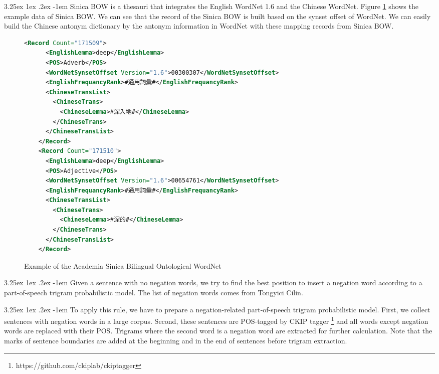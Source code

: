 \documentclass[12pt]{article}
\makeatletter
\newcounter{subsubsubsection}[subsubsection]
\renewcommand\paragraph{\@startsection{paragraph}{5}{\z@}%
  {3.25ex \@plus1ex \@minus.2ex}%
  {-1em}%
  {\normalfont\normalsize\bfseries}}
\makeatother
\begin{document}
\begin{CJK*}{UTF8}{bkai}
\begin{spacing}{1.77}
\paragraph{}
Sinica BOW is a thesauri that integrates the English WordNet 1.6 and the Chinese WordNet. Figure \ref{fig:bow} shows the example data of Sinica BOW. We can see that the record of the Sinica BOW is built based on the synset offset of WordNet. We can easily build the Chinese antonym dictionary by the antonym information in WordNet with these mapping records from Sinica BOW.

\begin{figure}
  \centering
  \caption{Example of the Academia Sinica Bilingual Ontological WordNet}
  \begin{minipage}{\linewidth}
    \begin{lstlisting}[language=XML]
    <Record Count="171509">
      <EnglishLemma>deep</EnglishLemma>
      <POS>Adverb</POS>
      <WordNetSynsetOffset Version="1.6">00300307</WordNetSynsetOffset>
      <EnglishFrequancyRank>#通用詞彙#</EnglishFrequancyRank>
      <ChineseTransList>
        <ChineseTrans>
          <ChineseLemma>#深入地#</ChineseLemma>
        </ChineseTrans>
      </ChineseTransList>
    </Record>
    <Record Count="171510">
      <EnglishLemma>deep</EnglishLemma>
      <POS>Adjective</POS>
      <WordNetSynsetOffset Version="1.6">00654761</WordNetSynsetOffset>
      <EnglishFrequancyRank>#通用詞彙#</EnglishFrequancyRank>
      <ChineseTransList>
        <ChineseTrans>
          <ChineseLemma>#深的#</ChineseLemma>
        </ChineseTrans>
      </ChineseTransList>
    </Record>
    \end{lstlisting}
  \end{minipage}
  \label{fig:bow}
\end{figure}

\paragraph{}
Given a sentence with no negation words, we try to find the best position to insert a negation word according to a part-of-speech trigram probabilistic model. The list of negation words comes from
Tongyici Cilin.

\paragraph{}
To apply this rule, we have to prepare a negation-related part-of-speech trigram probabilistic model. First, we collect sentences with negation words in a large corpus. Second, these sentences are POS-tagged by CKIP tagger \footnote{https://github.com/ckiplab/ckiptagger}\cite{Li_Fu_Ma_2020} and all words except negation words are replaced with their POS. Trigrams where the second word is a negation word are extracted for further calculation. Note that the marks of sentence boundaries are added at the beginning and in the end of sentences before trigram extraction.


\end{spacing}
\end{CJK*}
\end{document}
